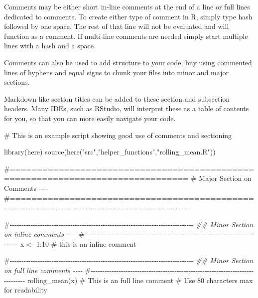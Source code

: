 \documentclass[
  letterpaper,
  DIV=11,
  numbers=noendperiod]{scrreprt}
\newenvironment{Shaded}{\begin{snugshade}}{\end{snugshade}}
\newcommand{\CommentTok}[1]{\textcolor[rgb]{0.37,0.37,0.37}{#1}}
\newcommand{\DecValTok}[1]{\textcolor[rgb]{0.68,0.00,0.00}{#1}}
\newcommand{\DocumentationTok}[1]{\textcolor[rgb]{0.37,0.37,0.37}{\textit{#1}}}
\newcommand{\FunctionTok}[1]{\textcolor[rgb]{0.28,0.35,0.67}{#1}}
\newcommand{\NormalTok}[1]{\textcolor[rgb]{0.00,0.23,0.31}{#1}}
\newcommand{\OtherTok}[1]{\textcolor[rgb]{0.00,0.23,0.31}{#1}}
\newcommand{\SpecialCharTok}[1]{\textcolor[rgb]{0.37,0.37,0.37}{#1}}
\newcommand{\StringTok}[1]{\textcolor[rgb]{0.13,0.47,0.30}{#1}}
\begin{document}
Comments may be either short in-line comments at the end of a line or
full lines dedicated to comments. To create either type of comment in R,
simply type hash followed by one space. The rest of that line will not
be evaluated and will function as a comment. If multi-line comments are
needed simply start multiple lines with a hash and a space.

Comments can also be used to add structure to your code, buy using
commented lines of hyphens and equal signs to chunk your files into
minor and major sections.

Markdown-like section titles can be added to these section and
subsection headers. Many IDEs, such as RStudio, will interpret these as
a table of contents for you, so that you can more easily navigate your
code.

\begin{Shaded}
\begin{Highlighting}[]
\CommentTok{\# This is an example script showing good use of comments and sectioning }

\FunctionTok{library}\NormalTok{(here)}
\FunctionTok{source}\NormalTok{(}\FunctionTok{here}\NormalTok{(}\StringTok{"src"}\NormalTok{,}\StringTok{"helper\_functions"}\NormalTok{,}\StringTok{"rolling\_mean.R"}\NormalTok{))}

\CommentTok{\#=============================================================================== }
\CommentTok{\# Major Section on Comments {-}{-}{-}{-}}
\CommentTok{\#===============================================================================}

\CommentTok{\#{-}{-}{-}{-}{-}{-}{-}{-}{-}{-}{-}{-}{-}{-}{-}{-}{-}{-}{-}{-}{-}{-}{-}{-}{-}{-}{-}{-}{-}{-}{-}{-}{-}{-}{-}{-}{-}{-}{-}{-}{-}{-}{-}{-}{-}{-}{-}{-}{-}{-}{-}{-}{-}{-}{-}{-}{-}{-}{-}{-}{-}{-}{-}{-}{-}{-}{-}{-}{-}{-}{-}{-}{-}{-}{-}{-}{-}{-}{-}}
\DocumentationTok{\#\#  Minor Section on inline comments {-}{-}{-}{-} }
\CommentTok{\#{-}{-}{-}{-}{-}{-}{-}{-}{-}{-}{-}{-}{-}{-}{-}{-}{-}{-}{-}{-}{-}{-}{-}{-}{-}{-}{-}{-}{-}{-}{-}{-}{-}{-}{-}{-}{-}{-}{-}{-}{-}{-}{-}{-}{-}{-}{-}{-}{-}{-}{-}{-}{-}{-}{-}{-}{-}{-}{-}{-}{-}{-}{-}{-}{-}{-}{-}{-}{-}{-}{-}{-}{-}{-}{-}{-}{-}{-}{-}}
\NormalTok{x }\OtherTok{\textless{}{-}} \DecValTok{1}\SpecialCharTok{:}\DecValTok{10} \CommentTok{\# this is an inline comment}

\CommentTok{\#{-}{-}{-}{-}{-}{-}{-}{-}{-}{-}{-}{-}{-}{-}{-}{-}{-}{-}{-}{-}{-}{-}{-}{-}{-}{-}{-}{-}{-}{-}{-}{-}{-}{-}{-}{-}{-}{-}{-}{-}{-}{-}{-}{-}{-}{-}{-}{-}{-}{-}{-}{-}{-}{-}{-}{-}{-}{-}{-}{-}{-}{-}{-}{-}{-}{-}{-}{-}{-}{-}{-}{-}{-}{-}{-}{-}{-}{-}{-}}
\DocumentationTok{\#\#  Minor Section on full line comments {-}{-}{-}{-} }
\CommentTok{\#{-}{-}{-}{-}{-}{-}{-}{-}{-}{-}{-}{-}{-}{-}{-}{-}{-}{-}{-}{-}{-}{-}{-}{-}{-}{-}{-}{-}{-}{-}{-}{-}{-}{-}{-}{-}{-}{-}{-}{-}{-}{-}{-}{-}{-}{-}{-}{-}{-}{-}{-}{-}{-}{-}{-}{-}{-}{-}{-}{-}{-}{-}{-}{-}{-}{-}{-}{-}{-}{-}{-}{-}{-}{-}{-}{-}{-}{-}{-}}
\FunctionTok{rolling\_mean}\NormalTok{(x)}
\CommentTok{\# This is an full line comment}
\CommentTok{\# Use 80 characters max for readability}
\end{Highlighting}
\end{Shaded}
\end{document}
